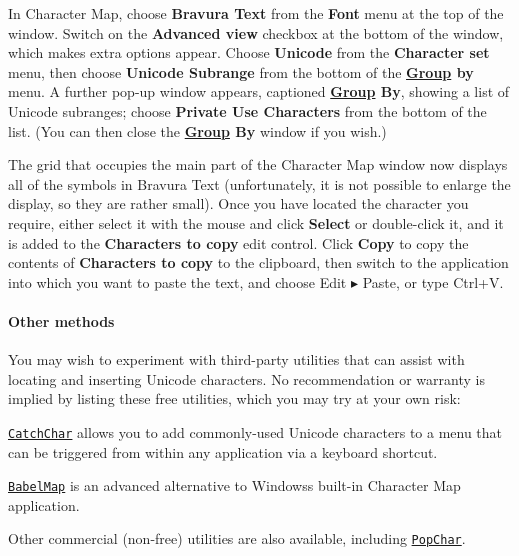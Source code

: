 In Character Map, choose {\bfseries Bravura Text} from the {\bfseries Font} menu at the top of the window. Switch on the {\bfseries Advanced view} checkbox at the bottom of the window, which makes extra options appear. Choose {\bfseries Unicode} from the {\bfseries Character set} menu, then choose {\bfseries Unicode Subrange} from the bottom of the {\bfseries \hyperlink{class_group}{Group} by} menu. A further pop-\/up window appears, captioned {\bfseries \hyperlink{class_group}{Group} By}, showing a list of Unicode subranges; choose {\bfseries Private Use Characters} from the bottom of the list. (You can then close the {\bfseries \hyperlink{class_group}{Group} By} window if you wish.)

The grid that occupies the main part of the Character Map window now displays all of the symbols in Bravura Text (unfortunately, it is not possible to enlarge the display, so they are rather small). Once you have located the character you require, either select it with the mouse and click {\bfseries Select} or double-\/click it, and it is added to the {\bfseries Characters to copy} edit control. Click {\bfseries Copy} to copy the contents of {\bfseries Characters to copy} to the clipboard, then switch to the application into which you want to paste the text, and choose {\ttfamily Edit} ▸ {\ttfamily Paste}, or type {\ttfamily Ctrl+V}.

\paragraph*{Other methods}

You may wish to experiment with third-\/party utilities that can assist with locating and inserting Unicode characters. No recommendation or warranty is implied by listing these free utilities, which you may try at your own risk\+:


\begin{DoxyItemize}
\item \href{http://helpingthings.com/index.php/insert-unicode-characters}{\tt Catch\+Char} allows you to add commonly-\/used Unicode characters to a menu that can be triggered from within any application via a keyboard shortcut.
\item \href{http://www.babelstone.co.uk/Software/BabelMap.html}{\tt Babel\+Map} is an advanced alternative to Windows\textquotesingle{}s built-\/in Character Map application.
\end{DoxyItemize}

Other commercial (non-\/free) utilities are also available, including \href{http://www.ergonis.com/products/popcharwin/}{\tt Pop\+Char}.

